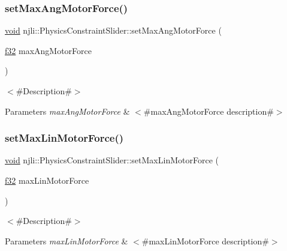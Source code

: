 \subsubsection{\texorpdfstring{set\+Max\+Ang\+Motor\+Force()}{setMaxAngMotorForce()}}
{\footnotesize\ttfamily \mbox{\hyperlink{_thread_8h_af1e856da2e658414cb2456cb6f7ebc66}{void}} njli\+::\+Physics\+Constraint\+Slider\+::set\+Max\+Ang\+Motor\+Force (\begin{DoxyParamCaption}\item[{\mbox{\hyperlink{_util_8h_a5f6906312a689f27d70e9d086649d3fd}{f32}}}]{max\+Ang\+Motor\+Force }\end{DoxyParamCaption})}

$<$\#\+Description\#$>$


\begin{DoxyParams}{Parameters}
{\em max\+Ang\+Motor\+Force} & $<$\#max\+Ang\+Motor\+Force description\#$>$ \\
\hline
\end{DoxyParams}
\mbox{\label{classnjli_1_1_physics_constraint_slider_ab8528b7eba6a82b9dfaed9d246ba784f}} 
\subsubsection{\texorpdfstring{set\+Max\+Lin\+Motor\+Force()}{setMaxLinMotorForce()}}
{\footnotesize\ttfamily \mbox{\hyperlink{_thread_8h_af1e856da2e658414cb2456cb6f7ebc66}{void}} njli\+::\+Physics\+Constraint\+Slider\+::set\+Max\+Lin\+Motor\+Force (\begin{DoxyParamCaption}\item[{\mbox{\hyperlink{_util_8h_a5f6906312a689f27d70e9d086649d3fd}{f32}}}]{max\+Lin\+Motor\+Force }\end{DoxyParamCaption})}

$<$\#\+Description\#$>$


\begin{DoxyParams}{Parameters}
{\em max\+Lin\+Motor\+Force} & $<$\#max\+Lin\+Motor\+Force description\#$>$ \\
\hline
\end{DoxyParams}
\mbox{\label{classnjli_1_1_physics_constraint_slider_a57013fed17878085a66adbe06df33545}} 
